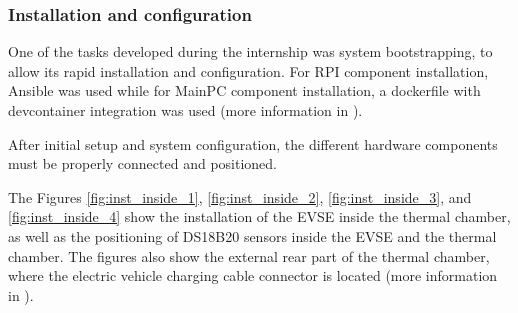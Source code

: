 \subsubsection{Installation and configuration}
One of the tasks developed during the internship was system bootstrapping, to allow its rapid installation and configuration. For RPI component installation, Ansible was used while for MainPC component installation, a dockerfile with devcontainer integration was used (more information in \cite{Documentation_drive_folder}).

After initial setup and system configuration, the different hardware components must be properly connected and positioned.

The Figures \ref{fig:inst_inside_1}, \ref{fig:inst_inside_2}, \ref{fig:inst_inside_3}, and \ref{fig:inst_inside_4} show the installation of the EVSE inside the thermal chamber, 
as well as the positioning of DS18B20 sensors inside the EVSE and the thermal chamber. The
figures also show the external rear part of the thermal chamber, where the electric vehicle
charging cable connector is located (more information in \cite{Documentation_drive_folder}).

